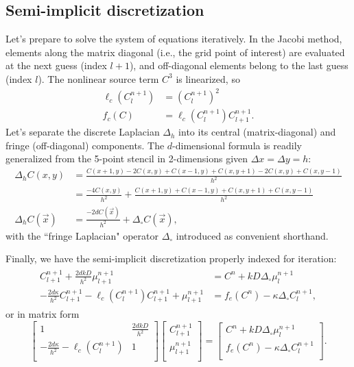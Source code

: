 	\subsection{Semi-implicit discretization}
	Let's prepare to solve the system of equations iteratively.
	In the Jacobi method, elements along the matrix diagonal (i.e., the grid point of interest) are evaluated at
	the next guess (index $l+1$), and off-diagonal elements belong to the last guess (index $l$).
	The nonlinear source term $C^3$ is linearized, so
	\begin{align*}
		\ell_c(C_l^{n+1}) &= \left(C_l^{n+1}\right)^2\\
		f_c(C) &= \ell_c(C_l^{n+1})C^{n+1}_{l+1}.
	\end{align*}
	Let's separate the discrete Laplacian $\Delta_h$ into its central (matrix-diagonal) and fringe (off-diagonal) components. The $d$-dimensional
	formula is readily generalized from the 5-point stencil in 2-dimensions given $\Delta x=\Delta y=h$:
	\begin{align*}
		\Delta_hC(x,y)	&= \frac{C(x+1,y)-2C(x,y)+C(x-1,y)+C(x,y+1)-2C(x,y)+C(x,y-1)}{h^2}\\
						&= \frac{-4C(x,y)}{h^2}+\frac{C(x+1,y)+C(x-1,y)+C(x,y+1)+C(x,y-1)}{h^2}\\
		\Delta_hC(\vec{x})	&= \frac{-2dC(\vec{x})}{h^2} + \Delta_\circ C(\vec{x}),
	\end{align*}
	with the ``fringe Laplacian" operator $\Delta_\circ$ introduced as convenient shorthand.

	Finally, we have the semi-implicit discretization properly indexed for iteration:
	\begin{align}
	\begin{split}
		C_{l+1}^{n+1} + \frac{2dkD}{h^2}\mu_{l+1}^{n+1} &= C^n + kD\Delta_\circ\mu_l^{n+1}\\
		-\frac{2d\kappa}{h^2}C_{l+1}^{n+1} - \ell_c(C_l^{n+1})C_{l+1}^{n+1} + \mu_{l+1}^{n+1} &= f_e(C^n) - \kappa\Delta_\circ C_l^{n+1},
	\end{split}
	\label{eqn:jacobieom}
	\end{align}
	or in matrix form
	\[
		\begin{bmatrix}
			1	&	\frac{2dkD}{h^2}\\[0.5em]
			-\frac{2d\kappa}{h^2} - \ell_c\left(C_l^{n+1}\right) & 1\\
		\end{bmatrix}
		\begin{bmatrix}
			C_{l+1}^{n+1} \\[0.5em]
			\mu_{l+1}^{n+1}\\
		\end{bmatrix}
		=
		\begin{bmatrix}
			C^n + kD\Delta_\circ\mu_l^{n+1}\\[0.5em]
			f_e(C^n) - \kappa\Delta_\circ C_l^{n+1}\\
		\end{bmatrix}.
	\]

